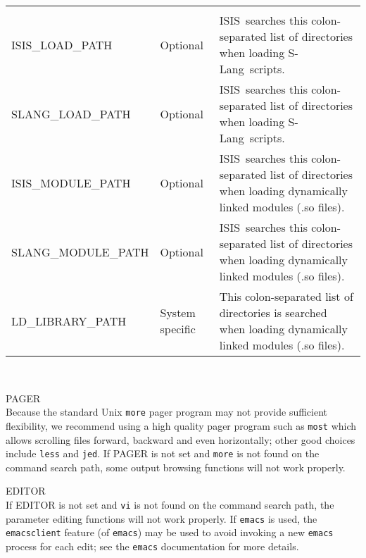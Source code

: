 \documentclass{book}
\newcommand{\isisx}{{\sc ISIS~}}
\newcommand{\slang}{{\sc S-Lang}}
\begin{document}
\begin{samepage}
\begin{table}[ht]
\begin{tabular}{|l|p{0.8in}|p{3.2in}|}
\rule[-1mm]{0mm}{1mm} & & \hfill \\
\hline
\rule[-1mm]{0mm}{1mm} & & \hfill \\

{\sc ISIS\_LOAD\_PATH} & Optional &
\isisx searches this colon-separated list of directories when loading
\slang{}ripts. \\

{\sc SLANG\_LOAD\_PATH} & Optional &
\isisx searches this colon-separated list of directories when loading
\slang{}ripts.\\

{\sc ISIS\_MODULE\_PATH} & Optional &
\isisx searches this colon-separated list of directories when loading
dynamically linked modules (.so files). \\

{\sc SLANG\_MODULE\_PATH} & Optional &
\isisx searches this colon-separated list of directories when loading
dynamically linked modules (.so files). \\

{\sc LD\_LIBRARY\_PATH} & System specific &
This colon-separated list of directories is searched when loading
dynamically linked modules (.so files). \\
\hline
\end{tabular}
\end{table}
\clearpage
{}~\begin{list}{}{
                 \setlength{\leftmargin}{1cm}
                 \setlength{\rightmargin}{1cm}
              }

\item[{\sc PAGER}] \hfill \\
Because the standard Unix {\tt more} pager program may not provide
sufficient flexibility, we recommend using a high quality pager program such
as {\tt most} which allows scrolling files forward, backward and even
horizontally; other good choices include {\tt less} and {\tt jed}. If {\sc
PAGER} is not set and {\tt more} is not found on the command search path,
some output browsing functions will not work properly. \\

\item[{\sc EDITOR}] \hfill \\
If {\sc EDITOR} is not set and {\tt vi} is not found on the
command search path, the parameter editing functions will not work properly.
If {\tt emacs} is used, the {\tt emacsclient} feature
(of {\tt emacs}) may be used to avoid invoking a new {\tt emacs} process for
each edit; see the {\tt emacs} documentation for more details. \\
\end{list}
\end{samepage}
\vfill
\end{document}
